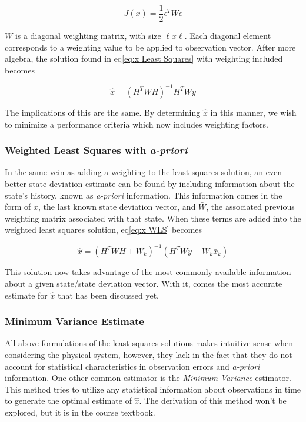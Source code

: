 \documentclass[12pt,a4paper,oneside]{article}
\numberwithin{equation}{section}   		%
\begin{document}
\begin{equation}
	J(x) = \frac{1}{2}\epsilon^T W \epsilon
	\label{eq: J WLS}
\end{equation}

$W$ is a diagonal weighting matrix, with size $\ell x \ell$. Each diagonal element corresponds to a weighting value to be applied to observation vector. After more algebra, the solution found in eq\eqref{eq:x Least Squares} with weighting included becomes

\begin{equation}
	\hat{x} = (H^TW  H)^{-1} H^T W y
	\label{eq:x WLS}
\end{equation}

The implications of this are the same. By determining $\hat{x}$ in this manner, we wish to minimize a performance criteria which now includes weighting factors.


\subsubsection{Weighted Least Squares with \emph{a-priori}}
\label{OD sub WLSap}
In the same vein as adding a weighting to the least squares solution, an even better state deviation estimate can be found by including information about the state's history, known as \emph{a-priori} information. This information comes in the form of $\bar{x}$, the last known state deviation vector, and $\bar{W}$, the associated previous weighting matrix associated with that state. When these terms are added into the weighted least squares solution, eq\eqref{eq:x WLS} becomes


\begin{equation}
	\hat{x} = (H^TW  H + \bar{W}_k)^{-1}  (H^T W y + \bar{W}_k   \bar{x}_k)
	\label{eq:x WLSap}
\end{equation}

This solution now takes advantage of the most commonly available information about a given state/state deviation vector. With it, comes the most accurate estimate for $\hat{x}$ that has been discussed yet. 

\subsubsection{Minimum Variance Estimate}
\label{OD sub MinVar}
All above formulations of the least squares solutions makes intuitive sense when considering the physical system, however, they lack in the fact that they do not account for statistical characteristics in observation errors and \emph{a-priori} information. One other common estimator is the \emph{Minimum Variance} estimator. This method tries to utilize any statistical information about observations in time to generate the optimal estimate of $\hat{x}$. The derivation of this method won't be explored, but it is in the course textbook. 
\end{document}

